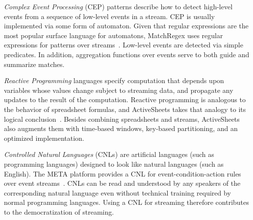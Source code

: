 \emph{Complex Event Processing} (CEP) patterns describe how to detect
high-level events from a sequence of low-level events in a
stream. CEP is usually implemented via some form of automaton. Given
that regular expressions are the most popular surface language for
automatons, \textsf{\small Match\-Regex} uses regular expressions for patterns over
streams~\cite{hirzel_2012}. Low-level events are detected via simple
predicates. In addition, aggregation functions over events serve to
both guide and summarize matches.

\emph{Reactive Programming} languages specify computation that depends
upon variables whose values change subject to streaming data, and
propagate any updates to the result of the computation. Reactive
programming is analogous to the behavior of spreadsheet formulas, and
ActiveSheets takes that analogy to its logical
conclusion~\cite{hirzel_et_al_2016}. Besides combining spreadsheets
and streams, ActiveSheets also augments them with time-based windows,
key-based partitioning, and an optimized implementation.

\emph{Controlled Natural Languages} (CNLs) are artificial languages
(such as programming languages) designed to look like natural
languages (such as English).  The META platform provides a CNL for
event-condition-action rules over event
streams~\cite{arnold_et_al_2016}. CNLs can be read and understood by
any speakers of the corresponding natural language even without
technical training required by normal programming languages. Using a
CNL for streaming therefore contributes to the democratization of
streaming.

\iffalse
Overall, the field of stream processing languages is diverse.  On the
formal side, Soul\'{e} et al.\ show how to unify three streaming languages
on a common core calculus~\cite{soule_et_al_2016}. Practical efforts
to consolidate and standardize should be informed by an overview of
the state of the art, which this tutorial provided.
\fi
